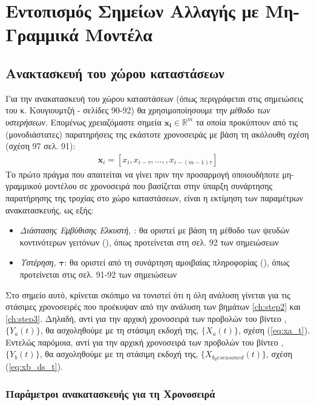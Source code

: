\chapter{Εντοπισμός Σημείων Αλλαγής με Μη-Γραμμικά Μοντέλα}
\label{ch:step6}
\thispagestyle{fancy}

\section{Ανακτασκευή του χώρου καταστάσεων}

Για την ανακατασκευή του χώρου καταστάσεων (όπως περιγράφεται στις σημειώσεις του κ. Κουγιουμτζή - σελίδες 90-92) θα χρησιμοποίησουμε την \textit{μέθοδο των υστερήσεων}. Επομένως χρειαζόμαστε σημεία  $\mathbf{x_i} \in \mathbb{R}^m$ τα οποία προκύπτουν από τις (μονοδιάστατες) παρατηρήσεις της εκάστοτε χρονοσειράς με βάση τη ακόλουθη σχέση (σχέση 97 σελ. 91):
\begin{align}
    \mathbf{x}_i = \left[x_i, x_{i-\tau}, ..., , x_{i-(m-1)\tau}\right]
\end{align}
Το πρώτο πράγμα που απαιτείται να γίνει πριν την προσαρμογή οποιουδήποτε μη-γραμμικού μοντέλου σε χρονοσειρά που βασίζεται στην ύπαρξη συνάρτησης παρατήρησης της τροχίας στο χώρο καταστάσεων, είναι η εκτίμηση των παραμέτρων ανακατασκευής, ως εξής:
\begin{itemize}
    \item \textit{Διάστασης Εμβύθισης Ελκυστή, \textbf{}}: θα οριστεί με βάση τη μέθοδο των ψευδών κοντινότερων γειτόνων (), όπως προτείνεται στη σελ. 92 των σημειώσεων
    \item \textit{Υστέρηση, $\mathbf{\tau}$}: θα οριστεί από τη συνάρτηση αμοιβαίας πληροφορίας (), όπως προτείνεται στις σελ. 91-92 των σημειώσεων
\end{itemize}

\par Στο σημείο αυτό, κρίνεται σκόπιμο να τονιστεί ότι η όλη ανάλυση γίνεται για τις στάσιμες χρονοσειρές που προέκυψαν από την ανάλυση των βημάτων \ref{ch:step2} και \ref{ch:step3}. Δηλαδή, αντί για την αρχική χρονοσειρά των προβολών του βίντεο , $\{Y_a(t)\}$, θα ασχοληθούμε με τη στάσιμη εκδοχή της, $\{X_a(t)\}$, σχέση (\ref{eq:xa_t}). Εντελώς παρόμοια, αντί για την αρχική χρονοσειρά των προβολών του βίντεο , $\{Y_b(t)\}$, θα ασχοληθούμε με τη στάσιμη εκδοχή της, $\{X_{b_deseasoned}(t)\}$, σχέση (\ref{eq:xb_ds_t}).

\subsection{Παράμετροι ανακατασκευής για τη Χρονοσειρά }

